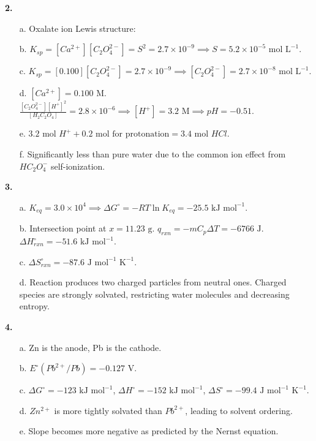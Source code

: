 \documentclass[10pt,a4paper]{article}
\begin{document}
\textbf{2.}
\begin{itemize}
    \item[a.] Oxalate ion Lewis structure:
    \begin{center}
    \end{center}
     \item[b.] $K_{sp} = [Ca^{2+}][C_2O_4^{2-}] = S^2 = 2.7 \times 10^{-9} \implies S = 5.2 \times 10^{-5}\text{ mol L}^{-1}$.
     \item[c.] $K_{sp} = [0.100][C_2O_4^{2-}] = 2.7 \times 10^{-9} \implies [C_2O_4^{2-}] = 2.7 \times 10^{-8}\text{ mol L}^{-1}$.
     \item[d.] $[Ca^{2+}] = 0.100\text{ M}$. $\frac{[C_2O_4^{2-}][H^+]^2}{[H_2C_2O_4]} = 2.8 \times 10^{-6} \implies [H^+] = 3.2\text{ M} \implies pH = -0.51$.
     \item[e.] $3.2\text{ mol } H^+ + 0.2\text{ mol for protonation} = 3.4\text{ mol } HCl$.
     \item[f.] Significantly less than pure water due to the common ion effect from $HC_2O_4^-$ self-ionization.
\end{itemize}

\textbf{3.}
\begin{itemize}
     \item[a.] $K_{eq} = 3.0 \times 10^4 \implies \Delta G^\circ = -RT\ln K_{eq} = -25.5\text{ kJ mol}^{-1}$.
     \item[b.] Intersection point at $x = 11.23\text{ g}$. $q_{rxn} = -m C_p \Delta T = -6766\text{ J}$. $\Delta H^\circ_{rxn} = -51.6\text{ kJ mol}^{-1}$.
     \item[c.] $\Delta S^\circ_{rxn} = -87.6\text{ J mol}^{-1}\text{ K}^{-1}$.
     \item[d.] Reaction produces two charged particles from neutral ones. Charged species are strongly solvated, restricting water molecules and decreasing entropy.
\end{itemize}

\textbf{4.}
\begin{itemize}
     \item[a.] Zn is the anode, Pb is the cathode.
     \item[b.] $E^\circ(Pb^{2+}/Pb) = -0.127\text{ V}$.
     \item[c.] $\Delta G^\circ = -123\text{ kJ mol}^{-1}$, $\Delta H^\circ = -152\text{ kJ mol}^{-1}$, $\Delta S^\circ = -99.4\text{ J mol}^{-1}\text{ K}^{-1}$.
     \item[d.] $Zn^{2+}$ is more tightly solvated than $Pb^{2+}$, leading to solvent ordering.
     \item[e.] Slope becomes more negative as predicted by the Nernst equation.
\end{itemize}
\end{document}
